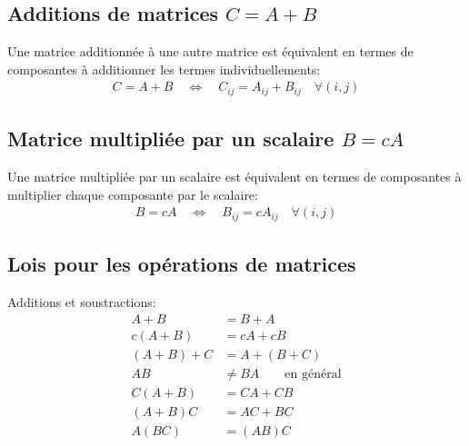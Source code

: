 \subsection{Additions de matrices $C = A + B $}

Une matrice additionnée à une autre matrice est équivalent en termes de composantes à additionner les termes individuellements:
\begin{align}
C  = A + B
\quad \Leftrightarrow \quad
C_{ij} = A_{ij} + B_{ij} \quad \forall (i,j)
\end{align}

\subsection{Matrice multipliée par un scalaire $B = cA$}

Une matrice multipliée par un scalaire est équivalent en termes de composantes à multiplier chaque composante par le scalaire:
\begin{align}
B = cA
\quad \Leftrightarrow \quad
B_{ij} = c A_{ij} \quad \forall (i,j)
\end{align}


\newpage
\subsection{Lois pour les opérations de matrices}

Additions et soustractions:
\begin{align}
A + B &= B + A     \\
c(A + B) &= cA + cB  \\
(A + B) + C &= A + (B + C) \\
AB &\neq BA \quad\quad \text{en général} \\
C(A + B) &= CA + CB \\
(A + B)C &= AC + BC \\
A(BC) &= (AB)C 
\end{align}

